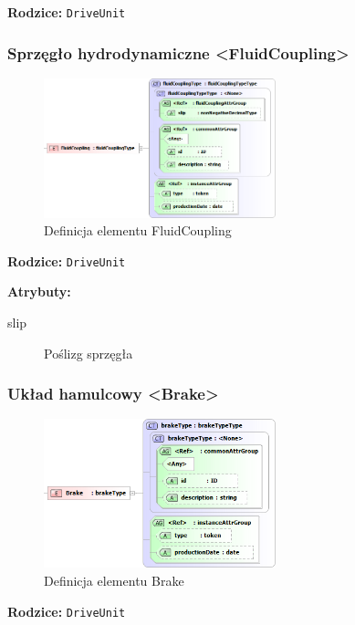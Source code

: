 \documentclass[12pt,a4paper]{article}
\begin{document}
\noindent\textbf{Rodzice:} \texttt{DriveUnit}

\subsubsection{Sprzęgło hydrodynamiczne <FluidCoupling>}

\begin{figure}[H]
  \centering
  \includegraphics[width=0.6\textwidth]{png/liquid/FluidCoupling}
  \caption{Definicja elementu FluidCoupling}
  \label{fig:fluidCoupling-xsd}
\end{figure}

\noindent\textbf{Rodzice:} \texttt{DriveUnit}

\noindent\textbf{Atrybuty:}
\begin{description}
\item[slip] Poślizg sprzęgła
\end{description}


\subsubsection{Układ hamulcowy <Brake>}

\begin{figure}[H]
  \centering
  \includegraphics[width=0.6\textwidth]{png/liquid/Brake}
  \caption{Definicja elementu Brake}
  \label{fig:brake-xsd}
\end{figure}

\noindent\textbf{Rodzice:} \texttt{DriveUnit}
\end{document}
